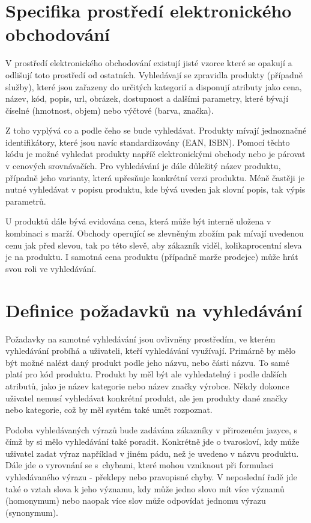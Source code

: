\documentclass[FM,DP]{tulthesis}
\begin{document}
\section{Specifika prostředí elektronického obchodování}

V prostředí elektronického obchodování existují jisté vzorce které se opakují a odlišují
toto prostředí od ostatních. Vyhledávají se zpravidla produkty (případně služby), které jsou
zařazeny do určitých kategorií a disponují atributy jako cena, název, kód, popis, url, obrázek, 
dostupnost a dalšími parametry, které bývají číselné (hmotnost, objem) nebo výčtové (barva, značka). 

Z toho vyplývá co a podle čeho se bude vyhledávat. Produkty mívají jednoznačné identifikátory, 
které jsou navíc standardizovány (EAN, ISBN). Pomocí těchto kódu je možné vyhledat produkty
napříč elektronickými obchody nebo je párovat v cenových srovnávačích. Pro vyhledávání
je dále důležitý název produktu, případně jeho varianty, která upřesňuje konkrétní
verzi produktu. Méně častěji je nutné vyhledávat v popisu produktu, kde bývá uveden
jak slovní popis, tak výpis parametrů. 

U produktů dále bývá evidována cena, která může být interně uložena v kombinaci s marží.
Obchody operující se zlevněným zbožím pak mívají uvedenou cenu jak před slevou, tak po této
slevě, aby zákazník viděl, kolikaprocentní sleva je na produktu. I samotná cena produktu
(případně marže prodejce) může hrát svou roli ve vyhledávání.

\section{Definice požadavků na vyhledávání}

Požadavky na samotné vyhledávání jsou ovlivněny prostředím, ve kterém vyhledávání
probíhá a uživateli, kteří vyhledávání využívají. Primárně by mělo být možné
nalézt daný produkt podle jeho názvu, nebo části názvu. To samé platí pro 
kód produktu. Produkt by měl být ale vyhledatelný i podle dalších atributů, 
jako je název kategorie nebo název značky výrobce. Někdy dokonce uživatel nemusí
vyhledávat konkrétní produkt, ale jen produkty dané značky nebo kategorie, což by
měl systém také umět rozpoznat.

Podoba vyhledávaných výrazů bude zadávána zákazníky v přirozeném jazyce, s čímž by si mělo
vyhledávání také poradit. Konkrétně jde o tvarosloví, kdy může uživatel zadat výraz
například v jiném pádu, než je uvedeno v názvu produktu. Dále jde o vyrovnání se
s~chybami, které mohou vzniknout při formulaci vyhledávaného výrazu - překlepy nebo
pravopisné chyby. V neposlední řadě jde také o vztah slova k jeho významu, kdy může
jedno slovo mít více významů (homonymum) nebo naopak více slov může odpovídat jednomu výrazu
(synonymum).
\end{document}
